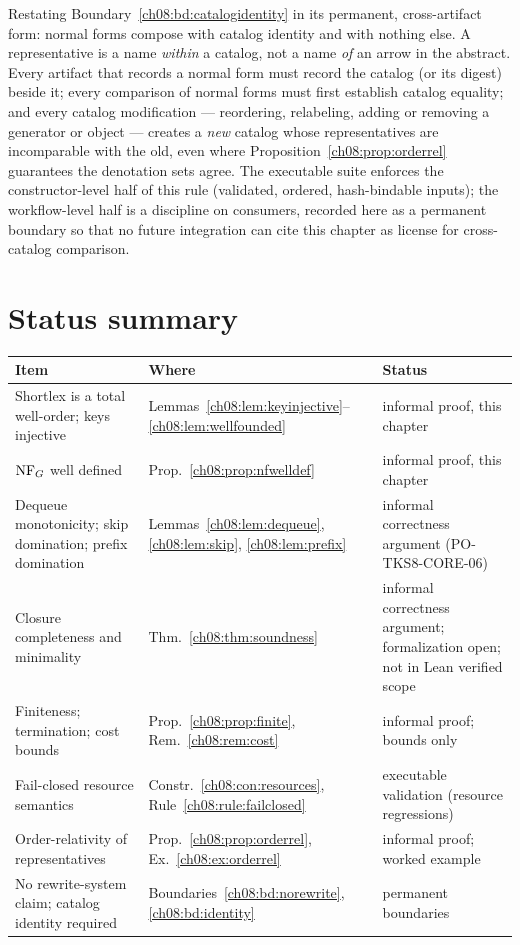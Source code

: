 \begin{boundary}\label{ch08:bd:identity}
Restating Boundary~\ref{ch08:bd:catalogidentity} in its permanent,
cross-artifact form: normal forms compose with catalog identity and with
nothing else. A representative is a name \emph{within} a catalog, not a
name \emph{of} an arrow in the abstract. Every artifact that records a
normal form must record the catalog (or its digest) beside it; every
comparison of normal forms must first establish catalog equality; and
every catalog modification --- reordering, relabeling, adding or removing a
generator or object --- creates a \emph{new} catalog whose representatives
are incomparable with the old, even where
Proposition~\ref{ch08:prop:orderrel} guarantees the denotation sets agree.
The executable suite enforces the constructor-level half of this rule
(validated, ordered, hash-bindable inputs); the workflow-level half is a
discipline on consumers, recorded here as a permanent boundary so that no
future integration can cite this chapter as license for cross-catalog
comparison.
\end{boundary}

\section{Status summary}\label{ch08:sec:status}

\begin{center}
\begin{tabular}{@{}lp{5.0cm}p{4.6cm}@{}}
\toprule
Item & Where & Status \\
\midrule
Shortlex is a total well-order; keys injective &
Lemmas~\ref{ch08:lem:keyinjective}--\ref{ch08:lem:wellfounded} &
informal proof, this chapter \\
$\mathrm{NF}_G$ well defined &
Prop.~\ref{ch08:prop:nfwelldef} &
informal proof, this chapter \\
Dequeue monotonicity; skip domination; prefix domination &
Lemmas~\ref{ch08:lem:dequeue}, \ref{ch08:lem:skip}, \ref{ch08:lem:prefix} &
informal correctness argument (PO-TKS8-CORE-06) \\
Closure completeness and minimality &
Thm.~\ref{ch08:thm:soundness} &
informal correctness argument; formalization open; not in Lean verified
scope \\
Finiteness; termination; cost bounds &
Prop.~\ref{ch08:prop:finite}, Rem.~\ref{ch08:rem:cost} &
informal proof; bounds only \\
Fail-closed resource semantics &
Constr.~\ref{ch08:con:resources}, Rule~\ref{ch08:rule:failclosed} &
executable validation (resource regressions) \\
Order-relativity of representatives &
Prop.~\ref{ch08:prop:orderrel}, Ex.~\ref{ch08:ex:orderrel} &
informal proof; worked example \\
No rewrite-system claim; catalog identity required &
Boundaries~\ref{ch08:bd:norewrite}, \ref{ch08:bd:identity} &
permanent boundaries \\
\bottomrule
\end{tabular}
\end{center}

